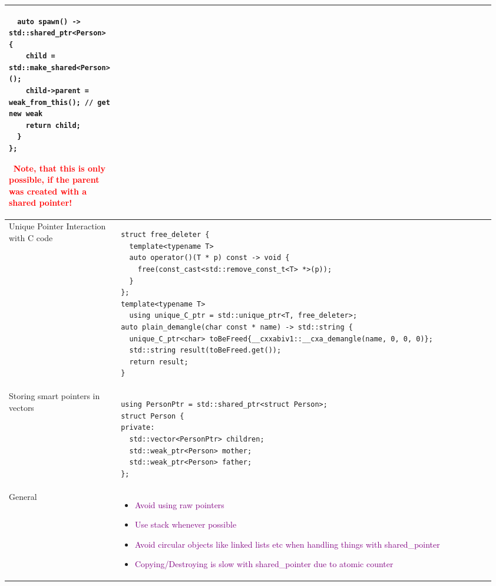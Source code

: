 \documentclass[main.tex,fontsize=8pt,paper=a4,paper=portrait,DIV=calc]{scrartcl}
\begin{document}
\begin{table}[ht!]
\begin{tabular}{|m{0.2\linewidth}|m{0.755\linewidth}|}
\begin{lstlisting}
  auto spawn() -> std::shared_ptr<Person> {
    child = std::make_shared<Person>();
    child->parent = weak_from_this(); // get new weak
    return child;
  }
};
\end{lstlisting} 
\, \newline
\textcolor{red}{Note, that this is only possible, if the parent \textbf{was created with a shared pointer!}}\\
\hline
Unique Pointer Interaction with C code & 
\vspace{2mm}
\begin{lstlisting}
struct free_deleter {
  template<typename T>
  auto operator()(T * p) const -> void {
    free(const_cast<std::remove_const_t<T> *>(p));
  }
};
template<typename T>
  using unique_C_ptr = std::unique_ptr<T, free_deleter>;
auto plain_demangle(char const * name) -> std::string {
  unique_C_ptr<char> toBeFreed{__cxxabiv1::__cxa_demangle(name, 0, 0, 0)};
  std::string result(toBeFreed.get());
  return result;
}
\end{lstlisting}\\
\hline
Storing smart pointers in vectors & 
\vspace{2mm}
\begin{lstlisting}
using PersonPtr = std::shared_ptr<struct Person>;
struct Person {
private:
  std::vector<PersonPtr> children;
  std::weak_ptr<Person> mother;
  std::weak_ptr<Person> father;
};
\end{lstlisting}\\
\hline
General & 
\vspace{2mm}
\begin{itemize}
\item \textcolor{purple}{Avoid using raw pointers}
\item \textcolor{purple}{Use stack whenever possible}
\item \textcolor{purple}{Avoid circular objects like linked lists etc when handling things with shared\_pointer}
\item \textcolor{purple}{Copying/Destroying is slow with shared\_pointer due to atomic counter}
\vspace{-3mm}
\end{itemize}\\ 
\hline
\end{tabular}
\end{table}
\pagebreak
\end{document}
